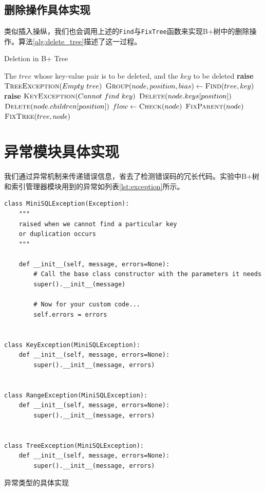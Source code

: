 \documentclass[UTF8]{ctexrep} %
\newenvironment{longlisting}{\captionsetup{type=listing}}{}
\begin{document}
\subsection{删除操作具体实现}
类似插入操纵，我们也会调用上述的\texttt{Find}与\texttt{FixTree}函数来实现B+树中的删除操作。算法\ref{alg:delete_tree}描述了这一过程。


\begin{algorithm}[H]
    \caption{Deletion in B+ Tree}
    \label{alg:delete_tree}
    \begin{algorithmic}
        \Require The $tree$ whose key-value pair is to be deleted, and the $key$ to be deleted
                \State \textbf{raise} $\Call{TreeException}{Empty\ tree}$
            \EndIf
            \State $\Call{Group}{node, position, bias} \leftarrow \Call{Find}{tree, key}$
                \State \textbf{raise} $\Call{KeyException}{Cannot\ find\ key}$
            \EndIf
            \State $\Call{Delete}{node.keys[position]}$
            \State $\Call{Delete}{node.children[position]}$ 
            \State $flow \leftarrow \Call{Check}{node}$
                \State $\Call{FixParent}{node}$
            \EndIf
            \State $\Call{FixTree}{tree, node}$
        \EndFunction
    \end{algorithmic}
\end{algorithm}

\section{异常模块具体实现}
我们通过异常机制来传递错误信息，省去了检测错误码的冗长代码。实验中B+树和索引管理器模块用到的异常如列表\ref{lst:exception}所示。

\begin{longlisting}
\begin{verbatim}
class MiniSQLException(Exception):
    """
    raised when we cannot find a particular key
    or duplication occurs
    """

    def __init__(self, message, errors=None):
        # Call the base class constructor with the parameters it needs
        super().__init__(message)

        # Now for your custom code...
        self.errors = errors


class KeyException(MiniSQLException):
    def __init__(self, message, errors=None):
        super().__init__(message, errors)


class RangeException(MiniSQLException):
    def __init__(self, message, errors=None):
        super().__init__(message, errors)


class TreeException(MiniSQLException):
    def __init__(self, message, errors=None):
        super().__init__(message, errors)
\end{verbatim}
\caption{异常类型的具体实现}
\label{lst:exception}
\end{longlisting}
\end{document}
